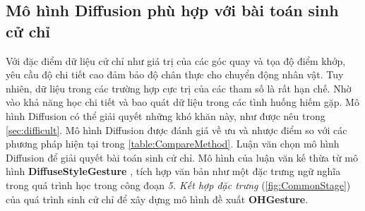 \subsection{Mô hình Diffusion phù hợp với bài toán sinh cử chỉ}
\label{subsec:reason}

Với đặc điểm dữ liệu cử chỉ như giá trị của các góc quay và tọa độ điểm khớp, yêu cầu độ chi tiết cao đảm bảo độ chân thực cho chuyển động nhân vật. Tuy nhiên, dữ liệu trong các trường hợp cực trị của các tham số là rất hạn chế. Nhờ vào khả năng học chi tiết và bao quát dữ liệu trong các tình huống hiếm gặp. Mô hình Diffusion có thể giải quyết những khó khăn này, như được nêu trong \autoref{sec:difficult}. Mô hình Diffusion được đánh giá về ưu và nhược điểm so với các phương pháp hiện tại trong \autoref{table:CompareMethod}. Luận văn chọn mô hình Diffusion để giải quyết bài toán sinh cử chỉ. Mô hình của luận văn kế thừa từ mô hình \textbf{DiffuseStyleGesture} \cite{yang2023diffusestylegesture}, tích hợp văn bản như một đặc trưng ngữ nghĩa trong quá trình học trong công đoạn \textit{5. Kết hợp đặc trưng} (\autoref{fig:CommonStage}) của quá trình sinh cử chỉ để xây dựng mô hình đề xuất \textbf{OHGesture}.
